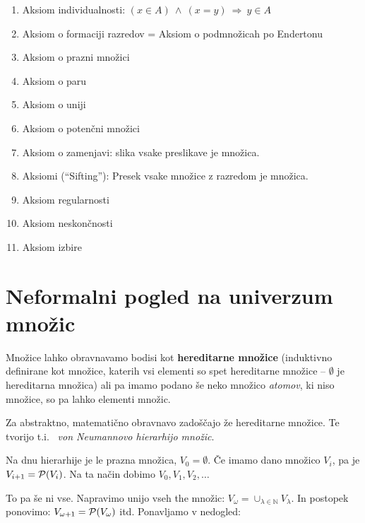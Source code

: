 \documentclass[11pt,paper=b5,footinclude,headinclude]{scrbook} %
\def\inn {{~\wedge~}}
\def\sledi {{~\Rightarrow~}}
\begin{document}
\begin{enumerate}
  \item Aksiom individualnosti: $(x\in A) \inn (x = y) \sledi y\in A$
   
  \item Aksiom o formaciji razredov = Aksiom o podmnožicah po Endertonu
  
  \item Aksiom o prazni množici

\item Aksiom o paru

  \item Aksiom o uniji
  
  \item Aksiom o potenčni množici

  \item Aksiom o zamenjavi: slika vsake preslikave je množica.

  \item Aksiomi (``Sifting''): Presek vsake množice z razredom je množica.

\item Aksiom regularnosti

  \item Aksiom neskončnosti

\item Aksiom izbire
\end{enumerate}


\section{Neformalni pogled na univerzum množic}

Množice lahko obravnavamo  bodisi kot \textbf{ hereditarne množice} (induktivno definirane kot množice, katerih vsi elementi so
spet hereditarne množice -- $\emptyset$ je hereditarna množica)
ali pa imamo podano še neko množico \emph{ atomov}, ki niso množice, so pa lahko elementi množic.

Za abstraktno, matematično obravnavo zadoščajo že hereditarne množice.
Te tvorijo t.i.~\emph{ von Neumannovo hierarhijo množic}.

Na dnu hierarhije je le prazna množica, $V_0 = \emptyset$.
Če imamo dano množico $V_i$, pa je $V_{i+1} = {\cal P}(V_i)$.
Na ta način dobimo $V_0, V_1, V_2, \ldots$

To pa še ni vse.
Napravimo unijo vseh the množic:
$V_\omega = \cup_{\lambda \in \mathbb{N}}V_\lambda$.
In postopek ponovimo:
$V_{\omega+1} = {\cal P}(V_\omega)$ itd.
Ponavljamo v nedogled:
\end{document}
